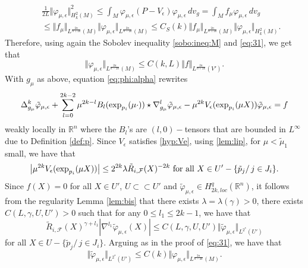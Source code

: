 \documentclass[reqno]{amsart}
\def \rn {\mathbb{R}^n}
\def \eps {\epsilon}
\def \crit {2^\star}
\def \F {{\mathcal F}}
\begin{document}
\begin{eqnarray*}
&&\frac{1}{2L}\Vert \varphi_{\mu,\eps}\Vert_{H_k^2(M)}^2\leq \int_M \varphi_{\mu,\eps}(P-V_\eps)\varphi_{\mu,\eps}\, dv_g=\int_M f_\mu\varphi_{\mu,\eps} \, dv_g\\
&&\leq  \Vert f_\mu\Vert_{L^{\frac{2n}{n+2k}}(M)} \Vert \varphi_{\mu,\eps}\Vert_{L^{\frac{2n}{n-2k}}(M)}\leq C_S(k) \Vert f_\mu\Vert_{L^{\frac{2n}{n+2k}}(M)} \Vert \varphi_{\mu,\eps}\Vert_{H_k^2(M)}.
\end{eqnarray*}
Therefore, using again the Sobolev inequality \eqref{sobo:ineq:M} and \eqref{eq:31}, we get that
\begin{equation}\label{eq:33}
\Vert \varphi_{\mu,\eps}\Vert_{L^{\frac{2n}{n-2k}}(M)}\leq C(k,L) \Vert f\Vert_{L^{\frac{2n}{n+2k}}(V')}.
\end{equation}
With $g_\mu$ as above, equation \eqref{eq:phi:alpha} rewrites
\begin{equation}\label{eq:tpl}
\Delta_{g_\mu}^k\tilde{\varphi}_{\mu,\eps}+\sum_{l=0}^{2k-2}\mu^{2k-l}B_l(\hbox{exp}_{p_i}(\mu \cdot))\star\nabla_{g_\mu}^l\tilde{\varphi}_{\mu,\eps}-\mu^{2k}V_\eps(\hbox{exp}_{p_i}(\mu X))\tilde{\varphi}_{\mu,\eps}=f
\end{equation}
weakly locally in $\rn$ where the $B_l$'s are $(l,0)-$tensors that are bounded in $L^\infty$ due to Definition \ref{def:p}. Since $V_\eps$ satisfies \eqref{hyp:Ve}, using \eqref{lem:lip}, for $\mu<\tilde{\mu}_1$ small, we have that 
\begin{equation*}
\left|\mu^{2k}V_\eps(\hbox{exp}_{p_i}(\mu X))\right|\leq 2^{2k}\lambda \tilde{R}_{i,\F}(X)^{-2k}\hbox{ for all }X\in U'-\{\tilde{p}_j/\, j\in J_i\}.
\end{equation*}
Since $f(X)=0$ for all $X\in U'$, $U\subset\subset U'$ and $\tilde{\varphi}_{\mu,\eps}\in H_{2k,loc}^q(\rn)$, it follows from the regularity Lemma \ref{lem:bis} that there exists $\lambda=\lambda(\gamma)>0$, there exists $C( L, \gamma,U, U')>0$ such that for any $0\leq l_1\leq 2k-1$, we have that
\begin{equation}\label{eq:44}
\tilde{R}_{i,\F}(X)^{\gamma+l_1} \left|\nabla^{l_1}\tilde{\varphi}_{\mu,\eps}(X)\right|\leq 
C( L,\gamma, U,U')\Vert \tilde{\varphi}_{\mu,\eps} \Vert_{L^{\crit}(U')}
\end{equation}
for all $X\in U-\{\tilde{p}_j/\, j\in J_i\}$. Arguing as in the proof of \eqref{eq:31}, we have that
\begin{equation}\label{eq:32}
\Vert \tilde{\varphi}_{\mu,\eps}\Vert_{L^{\crit}(U')}\leq C(k)\Vert  \varphi_{\mu,\eps}\Vert_{L^{\frac{2n}{n-2k}}(M)}.
\end{equation}
\end{document}
